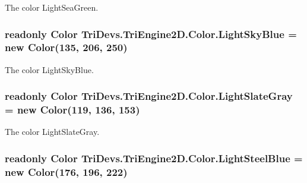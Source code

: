 The color Light\-Sea\-Green. 

\hypertarget{struct_tri_devs_1_1_tri_engine2_d_1_1_color_ad4f09c59ea160e02cb67e7a092467f0f}{
\subsubsection[{Light\-Sky\-Blue}]{\setlength{\rightskip}{0pt plus 5cm}readonly {\bf Color} Tri\-Devs.\-Tri\-Engine2\-D.\-Color.\-Light\-Sky\-Blue = new {\bf Color}(135, 206, 250)\hspace{0.3cm}{\ttfamily [static]}}}\label{struct_tri_devs_1_1_tri_engine2_d_1_1_color_ad4f09c59ea160e02cb67e7a092467f0f}


The color Light\-Sky\-Blue. 

\hypertarget{struct_tri_devs_1_1_tri_engine2_d_1_1_color_a9bdbe432499bebb309598b5f5d3178dd}{
\subsubsection[{Light\-Slate\-Gray}]{\setlength{\rightskip}{0pt plus 5cm}readonly {\bf Color} Tri\-Devs.\-Tri\-Engine2\-D.\-Color.\-Light\-Slate\-Gray = new {\bf Color}(119, 136, 153)\hspace{0.3cm}{\ttfamily [static]}}}\label{struct_tri_devs_1_1_tri_engine2_d_1_1_color_a9bdbe432499bebb309598b5f5d3178dd}


The color Light\-Slate\-Gray. 

\hypertarget{struct_tri_devs_1_1_tri_engine2_d_1_1_color_ad02c7b44ea5fe96eb0695ee16d9aa07a}{
\subsubsection[{Light\-Steel\-Blue}]{\setlength{\rightskip}{0pt plus 5cm}readonly {\bf Color} Tri\-Devs.\-Tri\-Engine2\-D.\-Color.\-Light\-Steel\-Blue = new {\bf Color}(176, 196, 222)\hspace{0.3cm}{\ttfamily [static]}}}\label{struct_tri_devs_1_1_tri_engine2_d_1_1_color_ad02c7b44ea5fe96eb0695ee16d9aa07a}


